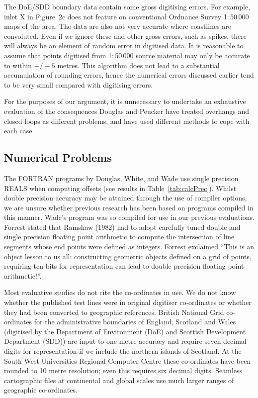 \documentclass{egpubl}
\begin{document}
The DoE/SDD boundary data contain some gross digitising errors. For example,
inlet X in Figure~2c does not feature on conventional Ordnance Survey
1:\,50\,000 maps of the area. The data are also not very accurate where
coastlines are convoluted. Even if we ignore these and other gross errors,
such as spikes, there will always be an element of random error in digitised
data. It is reasonable to assume that points digitised from 1:\,50\,000
source material may only be accurate to within $+/-5$ metres. This algorithm
does not lead to a substantial accumulation of rounding errors, hence the
numerical errors discussed earlier tend to be very small compared with
digitising errors.

For the purposes of our argument, it is unnecessary to undertake an
exhaustive evaluation of the consequences Douglas and Peucker have treated
overhangs and closed loops as different problems, and have used different
methods to cope with each case.

\subsection{Numerical Problems}

The FORTRAN programs by Douglas, White, and Wade use single precision REALS
when computing offsets (see results in Table~\ref{tab:calcPrec}). Whilst
double precision accuracy may be attained through the use of compiler
options, we are unsure whether previous research has been based on programs
compiled in this manner. Wade's program was so compiled for use in our
previous evaluations. Forrest stated that Ramshaw (1982) had to adopt
carefully tuned double and single precision floating point arithmetic to
compute the intersection of line segments whose end points were defined as
integers. Forrest exclaimed ``This is an object lesson to us all:
constructing geometric objects defined on a grid of points, requiring ten
bits for representation can lead to double precision floating point
arithmetic!''.

Most evaluative studies do not cite the co-ordinates in use. We do not know
whether the published test lines were in original digitiser co-ordinates or
whether they had been converted to geographic references. British National
Grid co-ordinates for the administrative boundaries of England, Scotland and
Wales (digitised by the Department of Environment (DoE) and Scottish
Development Department (SDD)) are input to one metre accuracy and require
seven decimal digits for representation if we include the northern islands of
Scotland. At the South West Universities Regional Computer Centre these
co-ordinates have been rounded to 10 metre resolution; even this requires six
decimal digits. Seamless cartographic files at continental and global scales
use much larger ranges of geographic co-ordinates.
\end{document}
